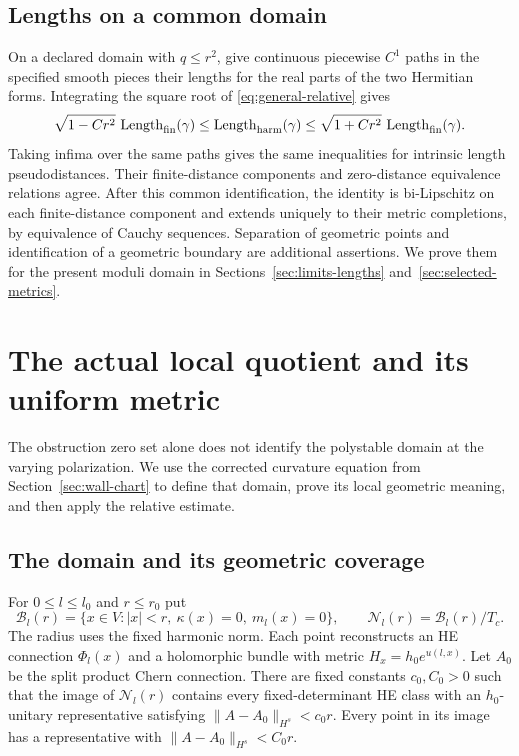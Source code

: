 \documentclass[11pt]{amsart}
\theoremstyle{definition}
\theoremstyle{remark}
\newcommand{\cB}{\mathcal B}
\newcommand{\cN}{\mathcal N}
\begin{document}
\subsection{Lengths on a common domain}
On a declared domain with $q\le r^2$, give continuous piecewise $C^1$
paths in the specified smooth pieces their lengths for the real parts of
the two Hermitian forms. Integrating the square root of
\eqref{eq:general-relative} gives
\begin{equation}\label{eq:general-lengths}
 \sqrt{1-Cr^2}\,\operatorname{Length}_{\rm fin}(\gamma)
 \le\operatorname{Length}_{\rm harm}(\gamma)
 \le\sqrt{1+Cr^2}\,\operatorname{Length}_{\rm fin}(\gamma).
\end{equation}
Taking infima over the same paths gives the same inequalities for
intrinsic length pseudodistances. Their finite-distance components and
zero-distance equivalence relations agree. After this common identification,
the identity is bi-Lipschitz on each finite-distance component and extends
uniquely to their metric completions, by equivalence of Cauchy sequences.
Separation of geometric points and identification of a geometric boundary
are additional assertions. We prove them for the present moduli domain
in Sections~\ref{sec:limits-lengths} and~\ref{sec:selected-metrics}.

\section{The actual local quotient and its uniform metric}\label{sec:full-quotient}

The obstruction zero set alone does not identify the polystable domain
at the varying polarization. We use the corrected curvature equation
from Section~\ref{sec:wall-chart} to define that domain, prove its local
geometric meaning, and then apply the relative estimate.

\subsection{The domain and its geometric coverage}
For $0\le l\le l_0$ and $r\le r_0$ put
\begin{equation}\label{eq:full-domain}
 \cB_l(r)=\{x\in V:|x|<r,\ \kappa(x)=0,\ m_l(x)=0\},
 \qquad \cN_l(r)=\cB_l(r)/T_c.
\end{equation}
The radius uses the fixed harmonic norm. Each point reconstructs an
HE connection $\Phi_l(x)$ and a holomorphic bundle with metric
$H_x=h_0e^{u(l,x)}$. Let $A_0$ be the split product Chern connection.
There are fixed constants $c_0,C_0>0$ such that the image of
$\cN_l(r)$ contains every fixed-determinant HE class with an
$h_0$-unitary representative satisfying
$\|A-A_0\|_{H^s}<c_0r$. Every point in its image has a representative
with $\|A-A_0\|_{H^s}<C_0r$.
\end{document}
